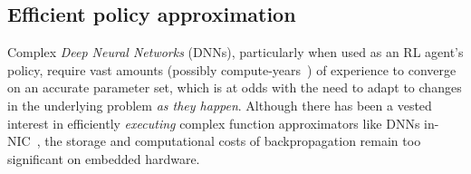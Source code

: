 \documentclass[
conference
,10pt
]{IEEEtran}
\begin{document}


\subsection{Efficient policy approximation}
Complex \emph{Deep Neural Networks} (DNNs), particularly when used as an RL agent's policy, require vast amounts (possibly compute-years~\parencite{DBLP:journals/corr/abs-1912-06680}) of experience to converge on an accurate parameter set, which is at odds with the need to adapt to changes in the underlying problem \emph{as they happen}.
Although there has been a vested interest in efficiently \emph{executing} complex function approximators like DNNs in-NIC~\parencite{DBLP:journals/corr/abs-2002-08987,DBLP:journals/corr/abs-2009-02353,DBLP:conf/sigcomm/SanvitoSB18,DBLP:journals/corr/abs-1801-05731,langlet-ml-netronome}, the storage and computational costs of backpropagation remain too significant on embedded hardware.

\end{document}

